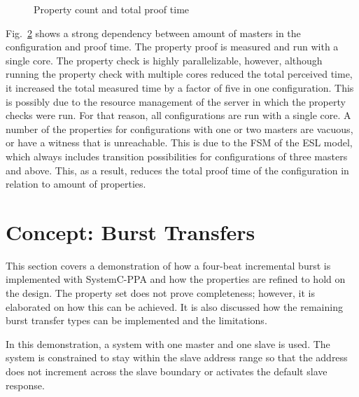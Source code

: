 \begin{figure}[hbt]
\begin{subfigure}{.5\textwidth}
\label{fig:sub4}
\end{subfigure}
\caption{Property count and total proof time}
\label{fig:proof}
\end{figure}

Fig.~\ref{fig:proof} shows a strong dependency between amount of masters in the configuration and proof time. The property proof is measured and run with a single core. The property check is highly parallelizable, however, although running the property check with multiple cores reduced the total perceived time, it increased the total measured time by a factor of five in one configuration. This is possibly due to the resource management of the server in which the property checks were run. For that reason, all configurations are run with a single core. A number of the properties for configurations with one or two masters are vacuous, or have a witness that is unreachable. This is due to the FSM of the ESL model, which always includes transition possibilities for configurations of three masters and above. This, as a result, reduces the total proof time of the configuration in relation to amount
of properties.
\section{Concept: Burst Transfers}
\label{sec:burst}
This section covers a demonstration of how a four-beat incremental burst is implemented with SystemC-PPA and how the properties are refined to hold on the design.
The property set does not prove completeness; however, it is elaborated on how this can be achieved. It is also discussed how the remaining burst transfer types can be implemented and the limitations. \par
In this demonstration, a system with one master and one slave is used. The system is constrained to stay within the slave address range so that the address does not increment across the slave boundary or activates the default slave response. 

